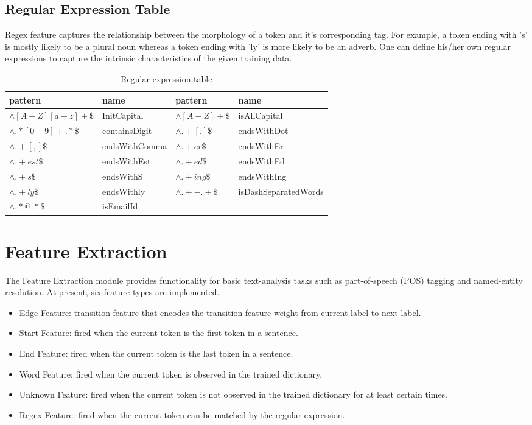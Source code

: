\subsection{Regular Expression Table}
  Regex feature captures the relationship between the morphology of a token and it's corresponding tag.
For example, a token ending with 's' is mostly likely to be a plural noun whereas a token ending with 'ly' is more likely to be an
adverb. One can define his/her own regular expressions to capture the intrinsic characteristics of the given training data.
\begin {table}[h]
\caption {Regular expression table} \label{tab:regex} 
\begin{center}
\begin{tabular}{ll||ll}
  pattern & name             & pattern & name\\
  \hline                        
  $\wedge[A-Z][a-z]+\$$    & InitCapital       & $\wedge[A-Z]+\$$  & isAllCapital \\
  $\wedge.*[0-9]+.*\$$     & containsDigit     & $\wedge.+[.]\$$   & endsWithDot\\
  $\wedge.+[,]\$$          & endsWithComma     & $\wedge.+er\$$    & endsWithEr\\
  $\wedge.+est\$$	   & endsWithEst       & $\wedge.+ed\$$    & endsWithEd\\
  $\wedge.+s\$$	           & endsWithS         & $\wedge.+ing\$$   & endsWithIng\\
  $\wedge.+ly\$$	   & endsWithly        & $\wedge.+-.+\$$   & isDashSeparatedWords\\
  $\wedge.*@.*\$$	   & isEmailId         &           & \\
  \hline  
\end{tabular}
\end{center}
\end{table}

\section{Feature Extraction}
The Feature Extraction module provides functionality for basic text-analysis
tasks such as part-of-speech (POS) tagging and named-entity resolution.
At present, six feature types are implemented.
    \begin{itemize}
    \item Edge Feature: transition feature that encodes the transition feature weight from current label to next label.
    \item Start Feature: fired when the current token is the first token in a sentence.
    \item End Feature: fired when the current token is the last token in a sentence.
    \item Word Feature: fired when the current token is observed in the trained dictionary.
    \item Unknown Feature: fired when the current token is not observed in the trained dictionary for at least certain times.
    \item Regex Feature: fired when the current token can be matched by the regular expression.
    \end{itemize}


